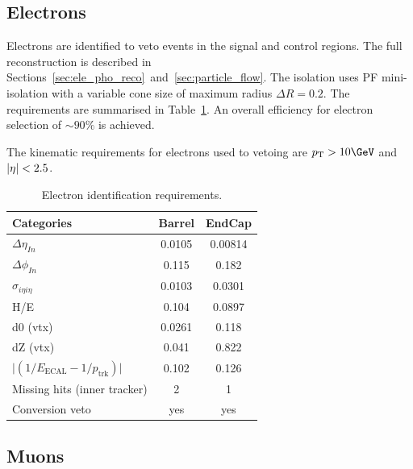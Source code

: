 \subsection{Electrons}

Electrons are identified to veto events in the signal and control regions. The full reconstruction is described in
Sections~\ref{sec:ele_pho_reco}~and~\ref{sec:particle_flow}. The isolation uses PF mini-isolation 
with a variable cone size of maximum radius $\Delta R = 0.2$. The requirements are summarised in 
Table~\ref{tab:ele-id}. An overall efficiency for electron selection of $\sim90\%$ is achieved.

The kinematic requirements for electrons used to vetoing are $\pt > 10\GeV$ and $|\eta| < 2.5$.
\begin{table}[h!]
  \caption{Electron identification requirements.\label{tab:ele-id}}
  \centering
  \footnotesize
  \begin{tabular}{ lcc }
    \hline
    \hline
    Categories                                               & Barrel    & EndCap    \\
    \hline
    $\Delta \eta_{In}$                                       & 0.0105   & 0.00814  \\
    $\Delta \phi_{In}$                                       & 0.115    & 0.182  \\
    $\sigma_{i\eta i\eta}$                                   & 0.0103    & 0.0301  \\
    H/E                                                      & 0.104    & 0.0897   \\
    d0 (vtx)                                                 & 0.0261    & 0.118  \\
    dZ (vtx)                                                 & 0.041    & 0.822  \\
    $\lvert(1/E_{\textrm{ECAL}} - 1/p_{\textrm{trk}})\rvert$ & 0.102     & 0.126  \\
    Missing hits (inner tracker)                             & 2         & 1         \\
    Conversion veto                                          & yes       & yes   \\
    \hline
    \hline
  \end{tabular}
  \end{table}
\subsection{Muons}

